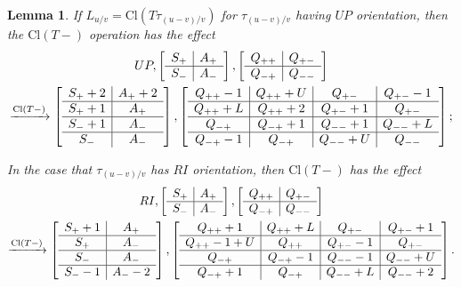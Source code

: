 \documentclass[11pt]{amsart}
\theoremstyle{plain}
\newtheorem{lemmaN}[theoremN]{Lemma}
\theoremstyle{definition}
\theoremstyle{remark}
\begin{document}
\begin{lemmaN}
   \label{WSclosureformulaL}
    If $L_{u/v}=\text{Cl}(T\tau_{(u-v)/v})$ for $\tau_{(u-v)/v}$ having $UP$ orientation, then the $\text{Cl}(T-)$ operation has the effect
   \begin{multline*}
      UP, \left[\begin{array}{ c | c  }
    S_+ & A_+  \\
    \hline
    S_- & A_- 
  \end{array}\right],  
  \left[\begin{array}{ c |c }
    Q_{++} & Q_{+-} \\
    \hline
    Q_{-+} & Q_{--}
  \end{array}\right]
  \\
    \xrightarrow{\text{Cl}(T-)}
    \left[\begin{array}{ c | c  }
    S_++2 & A_++2 \\
    \hline
    S_++1 & A_+  \\
    \hline
    S_-+1 & A_- \\
    \hline
    S_- & A_-
  \end{array}\right], 
  \left[\begin{array}{ c | c | c | c}
    Q_{++}-1 & Q_{++}+U & Q_{+-} & Q_{+-}-1 \\
    \hline
    Q_{++}+L & Q_{++}+2 & Q_{+-}+1 & Q_{+-}\\
    \hline
    Q_{-+} & Q_{-+}+1 & Q_{--}+1 & Q_{--}+L \\
    \hline
    Q_{-+}-1 & Q_{-+} & Q_{--}+U & Q_{--}
  \end{array}\right];
   \end{multline*}
   

  In the case that $\tau_{(u-v)/v}$ has $RI$ orientation, then $\text{Cl}(T-)$ has the effect
\begin{multline*}
      RI, \left[\begin{array}{ c | c  }
    S_+ & A_+  \\
    \hline
    S_- & A_- 
  \end{array}\right],  
  \left[\begin{array}{ c |c }
    Q_{++} & Q_{+-} \\
    \hline
    Q_{-+} & Q_{--}
  \end{array}\right]
  \\
    \xrightarrow{\text{Cl}(T-)}
    \left[\begin{array}{ c | c  }
    S_+ +1 & A_+  \\
    \hline
    S_+ & A_-  \\
    \hline
    S_-  & A_- \\
    \hline
    S_--1 & A_--2
  \end{array}\right], 
   \left[\begin{array}{ c | c | c | c}
    Q_{++}+1 & Q_{++}+L & Q_{+-} & Q_{+-}+1 \\
    \hline
    Q_{++}-1+U & Q_{++} & Q_{+-}-1 & Q_{+-}\\
    \hline
    Q_{-+} & Q_{-+}-1 & Q_{--}-1 & Q_{--}+U \\
    \hline
    Q_{-+}+1 & Q_{-+} & Q_{--}+L & Q_{--}+2
  \end{array}\right].
   \end{multline*}
 

\end{lemmaN}
\end{document}
